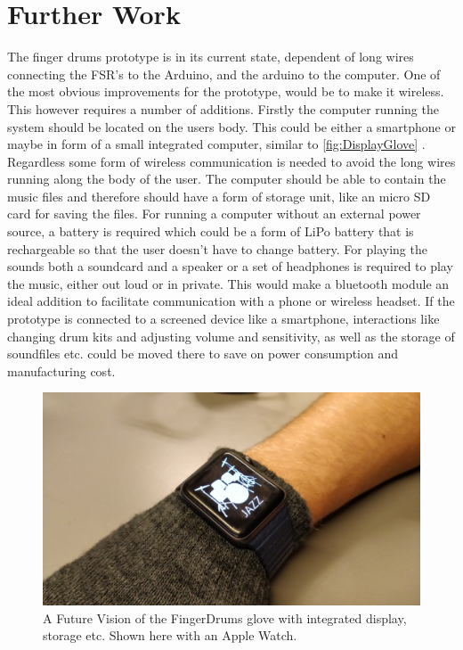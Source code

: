 \chapter{Further Work}
\label{further_work}

The finger drums prototype is in its current state, dependent of long wires connecting the FSR's to the Arduino, and the arduino to the computer. One of the most obvious improvements for the prototype, would be to make it wireless. This however requires a number of additions. Firstly the computer running the system should be located on the users body. This could be either a smartphone or maybe in form of a small integrated computer, similar to \autoref{fig:DisplayGlove} . Regardless some form of wireless communication is needed to avoid the long wires running along the body of the user. The computer should be able to contain the music files and therefore should have a form of storage unit, like an micro SD card for saving the files. For running a computer without an external power source, a battery is required which could be a form of LiPo battery that is rechargeable so that the user doesn't have to change battery. For playing the sounds both a soundcard and a speaker or a set of headphones is required to play the music, either out loud or in private. This would make a bluetooth module an ideal addition to facilitate communication with a phone or wireless headset.
If the prototype is connected to a screened device like a smartphone, interactions like changing drum kits and adjusting volume and sensitivity, as well as the storage of soundfiles etc. could be moved there to save on power consumption and manufacturing cost.

\begin{figure}[H]
\centering
\includegraphics[scale=0.05]{Figure/Billeder/DisplayGlove.jpg}
\caption{A Future Vision of the FingerDrums glove with integrated display, storage etc. Shown here with an Apple Watch.}
\label{fig:DisplayGlove}
\end{figure}

